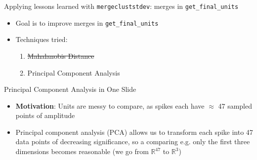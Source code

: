 \documentclass{beamer}
\begin{document}
    \begin{frame}{Applying lessons learned with \texttt{mergecluststdev}: merges
in \texttt{get\_final\_units}}
    \begin{itemize}
        \pause
        \item Goal is to improve merges in \texttt{get\_final\_units}
        \pause
        \item Techniques tried:
        \begin{enumerate}
            \pause
            \item \sout{Mahalanobis Distance}
            \item {Principal Component Analysis}
        \end{enumerate}
     \end{itemize}
    \end{frame} 
    
    \begin{frame}{Principal Component Analysis in One Slide}
        \begin{itemize}
            \pause
            \item \textbf{Motivation}: Units are messy to compare, as spikes
each have \ensuremath{\approx} 47 sampled points of amplitude
            \pause
            \item Principal component analysis (PCA) allows us to transform each
spike into 47 data points of decreasing significance, so a comparing e.g. only
the first three dimensions becomes reasonable (we go from
\ensuremath{\mathbb{R}^{47}} to \ensuremath{\mathbb{R}^3})
         \end{itemize}
    \end{frame}
     
\end{document}
